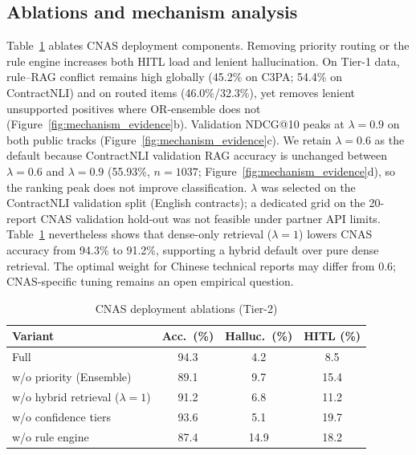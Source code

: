 \subsection{Ablations and mechanism analysis}

Table~\ref{tab:ablation} ablates CNAS deployment components. Removing priority routing or the rule engine increases both HITL load and lenient hallucination. On Tier-1 data, rule--RAG conflict remains high globally (45.2\% on C3PA; 54.4\% on ContractNLI) and on routed items (46.0\%/32.3\%), yet \HRAG{} removes lenient unsupported positives where OR-ensemble does not (Figure~\ref{fig:mechanism_evidence}b). Validation NDCG@10 peaks at $\lambda=0.9$ on both public tracks (Figure~\ref{fig:mechanism_evidence}c). We retain $\lambda=0.6$ as the default because ContractNLI validation RAG accuracy is unchanged between $\lambda=0.6$ and $\lambda=0.9$ (55.93\%, $n{=}1037$; Figure~\ref{fig:mechanism_evidence}d), so the ranking peak does not improve classification. $\lambda$ was selected on the ContractNLI validation split (English contracts); a dedicated grid on the 20-report CNAS validation hold-out was not feasible under partner API limits. Table~\ref{tab:ablation} nevertheless shows that dense-only retrieval ($\lambda{=}1$) lowers CNAS accuracy from 94.3\% to 91.2\%, supporting a hybrid default over pure dense retrieval. The optimal weight for Chinese technical reports may differ from 0.6; CNAS-specific tuning remains an open empirical question.

\begin{table}[t]
\centering
\caption{CNAS deployment ablations (Tier-2)}
\label{tab:ablation}
\small
\begin{tabular}{@{}lccc@{}}
\toprule
Variant & Acc.\ (\%) & Halluc.\ (\%) & HITL (\%) \\
\midrule
Full \HRAG{}               & 94.3 & 4.2 & 8.5 \\
w/o priority (Ensemble)    & 89.1 & 9.7 & 15.4 \\
w/o hybrid retrieval ($\lambda{=}1$) & 91.2 & 6.8 & 11.2 \\
w/o confidence tiers       & 93.6 & 5.1 & 19.7 \\
w/o rule engine            & 87.4 & 14.9 & 18.2 \\
\bottomrule
\end{tabular}
\end{table}

